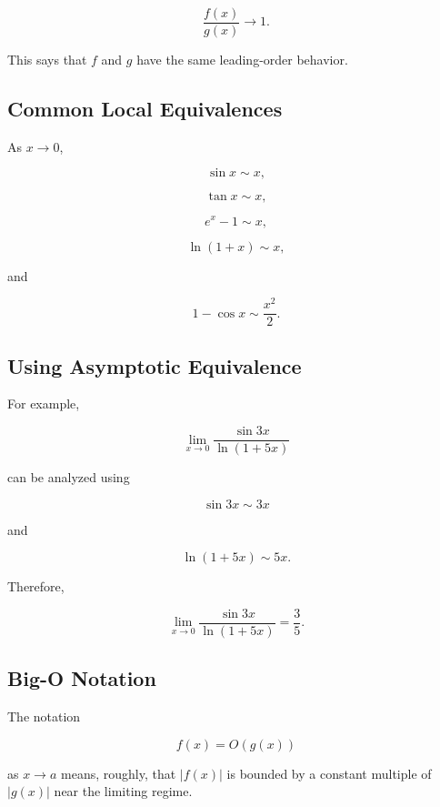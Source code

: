 \[
\boxed{
\frac{f(x)}{g(x)}
\to1.
}
\]

This says that \(f\) and \(g\) have the same leading-order behavior.

\subsection{Common Local Equivalences}
\label{subsec:common-local-equivalences}

As \(x\to0\),

\[
\boxed{
\sin x
\sim
x,
}
\]

\[
\boxed{
\tan x
\sim
x,
}
\]

\[
\boxed{
e^x-1
\sim
x,
}
\]

\[
\boxed{
\ln(1+x)
\sim
x,
}
\]

and

\[
\boxed{
1-\cos x
\sim
\frac{x^2}{2}.
}
\]

\subsection{Using Asymptotic Equivalence}
\label{subsec:using-asymptotic-equivalence}

For example,

\[
\lim_{x\to0}
\frac{
\sin3x
}{
\ln(1+5x)
}
\]

can be analyzed using

\[
\sin3x\sim3x
\]

and

\[
\ln(1+5x)\sim5x.
\]

Therefore,

\[
\boxed{
\lim_{x\to0}
\frac{
\sin3x
}{
\ln(1+5x)
}
=
\frac35.
}
\]

\subsection{Big-O Notation}
\label{subsec:big-o-limit-reference}

The notation

\[
\boxed{
f(x)=O(g(x))
}
\]

as \(x\to a\) means, roughly, that \(|f(x)|\) is bounded by a constant
multiple of \(|g(x)|\) near the limiting regime.

